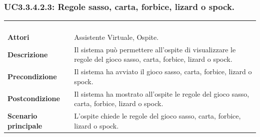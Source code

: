 \subsubsection{UC3.3.4.2.3: Regole sasso, carta, forbice, lizard o spock.}
\label{UC3.3.4.2.3}
\begin{longtable}{l|p{10cm}}
\rowcolor[gray]{0.8} \multicolumn{2}{c}{} \\
\rowcolor[gray]{0.8} \multicolumn{2}{c}{\textbf{UC3.3.4.2.3 - Regole sasso, carta, forbice, lizard o spock.}} \\
\rowcolor[gray]{0.8} \multicolumn{2}{c}{} \\
\hline
&\\
\textbf{Attori} & Assistente Virtuale, Ospite.\\[7pt]
\textbf{Descrizione} & Il sistema può permettere all'ospite di visualizzare le regole del gioco sasso, carta, forbice, lizard o spock.\\[7pt]
\textbf{Precondizione} & Il sistema ha avviato il gioco sasso, carta, forbice, lizard o spock.\\[7pt]
\textbf{Postcondizione} & Il sistema ha mostrato all'ospite le regole del gioco sasso, carta, forbice, lizard o spock.\\[7pt]
\textbf{Scenario principale} &L'ospite chiede le regole del gioco sasso, carta, forbice, lizard o spock.\\[7pt]\hline
\end{longtable}

